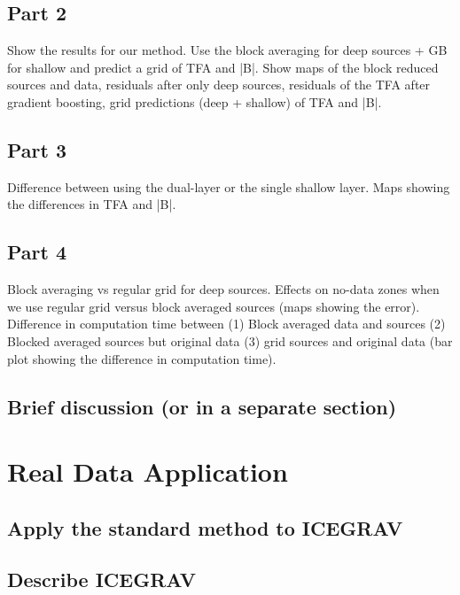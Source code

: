 \subsection{Part 2}
Show the results for our method. Use the block averaging for deep sources + GB for shallow and predict a grid of TFA and |B|. Show maps of the block reduced sources and data, residuals after only deep sources, residuals of the TFA after gradient boosting, grid predictions (deep + shallow) of TFA and |B|.

\subsection{Part 3}
Difference between using the dual-layer or the single shallow layer. Maps showing the differences in TFA and |B|.

\subsection{Part 4}
Block averaging vs regular grid for deep sources. Effects on no-data zones when we use regular grid versus block averaged sources (maps showing the error). Difference in computation time between (1) Block averaged data and sources (2) Blocked averaged sources but original data (3) grid sources and original data (bar plot showing the difference in computation time).

\subsection{Brief discussion (or in a separate section)}



\section{Real Data Application}

\subsection{Apply the standard method to ICEGRAV}

\subsection{Describe ICEGRAV}

